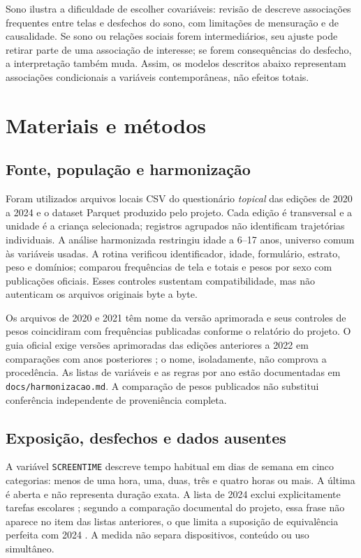 ﻿\documentclass[12pt]{article}
\begin{document}
Sono ilustra a dificuldade de escolher covariáveis: revisão de \cite{hale2015} descreve associações frequentes entre telas e desfechos do sono, com limitações de mensuração e de causalidade. Se sono ou relações sociais forem intermediários, seu ajuste pode retirar parte de uma associação de interesse; se forem consequências do desfecho, a interpretação também muda. Assim, os modelos descritos abaixo representam associações condicionais a variáveis contemporâneas, não efeitos totais.
\section{Materiais e métodos}
\subsection{Fonte, população e harmonização}
Foram utilizados arquivos locais CSV do questionário \textit{topical} das edições de 2020 a 2024 e o dataset Parquet produzido pelo projeto. Cada edição é transversal e a unidade é a criança selecionada; registros agrupados não identificam trajetórias individuais. A análise harmonizada restringiu idade a 6--17 anos, universo comum às variáveis usadas. A rotina verificou identificador, idade, formulário, estrato, peso e domínios; comparou frequências de tela e totais e pesos por sexo com publicações oficiais. Esses controles sustentam compatibilidade, mas não autenticam os arquivos originais byte a byte.

Os arquivos de 2020 e 2021 têm nome da versão aprimorada e seus controles de pesos coincidiram com frequências publicadas conforme o relatório do projeto. O guia oficial exige versões aprimoradas das edições anteriores a 2022 em comparações com anos posteriores \cite{censusguide}; o nome, isoladamente, não comprova a procedência. As listas de variáveis e as regras por ano estão documentadas em \texttt{docs/harmonizacao.md}. A comparação de pesos publicados não substitui conferência independente de proveniência completa.

\subsection{Exposição, desfechos e dados ausentes}
A variável \texttt{SCREENTIME} descreve tempo habitual em dias de semana em cinco categorias: menos de uma hora, uma, duas, três e quatro horas ou mais. A última é aberta e não representa duração exata. A lista de 2024 exclui explicitamente tarefas escolares \cite{census2024}; segundo a comparação documental do projeto, essa frase não aparece no item das listas anteriores, o que limita a suposição de equivalência perfeita com 2024 \cite{census2020}. A medida não separa dispositivos, conteúdo ou uso simultâneo.
\end{document}
